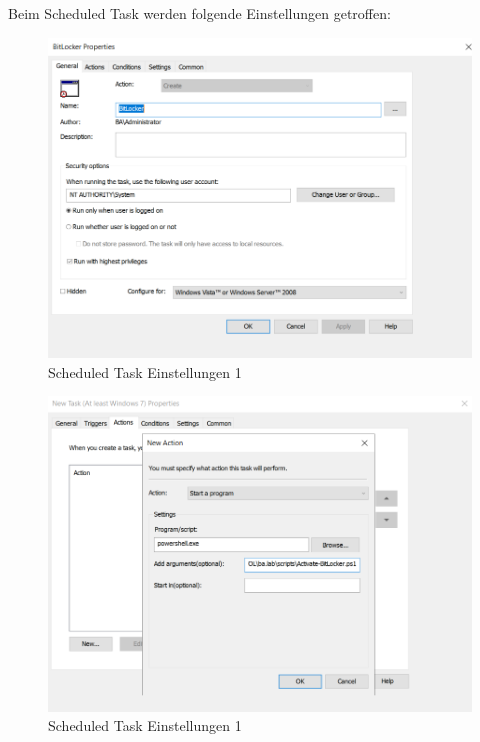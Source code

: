 Beim Scheduled Task werden folgende Einstellungen getroffen:\\
\begin{minipage}{0.5\linewidth}
    \begin{figure}[H]
        \centering
        \includegraphics[width=\linewidth]{../img/Encryption/scheduled-task-1.png}
        \caption{Scheduled Task Einstellungen 1}
    \end{figure}
\end{minipage}
\begin{minipage}{0.5\linewidth}
    \begin{figure}[H]
        \centering
        \includegraphics[width=\linewidth]{../img/Encryption/scheduled-task-2.png}
        \caption{Scheduled Task Einstellungen 1}
    \end{figure}
\end{minipage}\\

